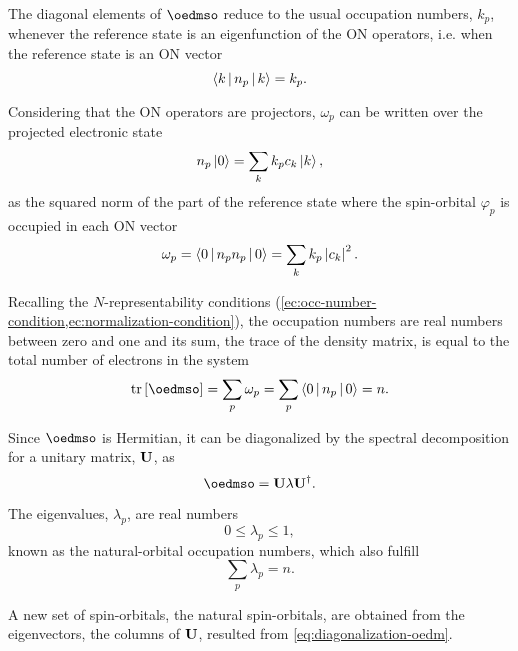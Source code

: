 The diagonal elements of $ \mat{\oedmso}$ reduce to the usual occupation numbers,
$k_p$, whenever the reference state is an eigenfunction of the ON operators, i.e.
when the reference state is an ON vector 
\begin{equation}
    \Braket{k | n_p | k} = k_p
    .
\end{equation}

Considering that the ON operators are projectors, $\omega_p$ can be written 
over the projected electronic state 
\begin{equation}
    n_p \Ket{0} = \sum_{k} k_p c_k \Ket{k}
    ,
\end{equation}
as 
the squared norm of the part of the reference state where the spin-orbital
$\varphi_p$ is occupied in each ON vector
\begin{equation}
    \omega_p =
    \Braket{0 | n_p n_p | 0} =
    \sum_{k} k_p \left| c_k \right|^2
    .
\end{equation}

Recalling the $N$-representability conditions 
(\cref{ec:occ-number-condition,ec:normalization-condition}),
the occupation numbers are real numbers between zero and one 
and its sum, the trace of the density matrix, is equal to the total number
of electrons in the system 
\begin{equation}
    \trace \left[ \mat{\oedmso} \right] =
    \sum_{p} \omega_p =
    \sum_{p} \Braket{0 | n_p | 0} =
    n
    .
\end{equation}

Since $ \mat{\oedmso}$ is Hermitian, it can be diagonalized by the spectral
decomposition for a unitary matrix, $ \mat{U}$, as
\begin{equation} \label{eq:diagonalization-oedm}
    \mat{\oedmso} =
    \mat{U} \lambda \mat{U}^{\dagger}
    .
\end{equation}

The eigenvalues, $\lambda_p$, are real numbers 
\begin{equation}
    0 \le \lambda_p \le 1
    ,
\end{equation}
known as the natural-orbital occupation numbers, which also fulfill 
\begin{equation}
    \sum_{p} \lambda_p = n
    .
\end{equation}

A new set of spin-orbitals, the natural spin-orbitals, are obtained from the
eigenvectors, the columns of $ \mat{U}$, resulted from 
\cref{eq:diagonalization-oedm}.

